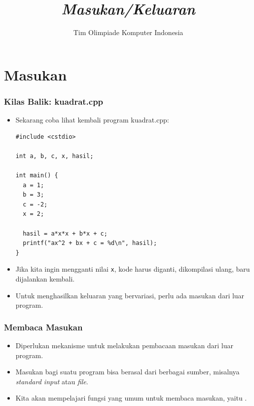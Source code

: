 

\title{\textit{Masukan/Keluaran}}
\author{Tim Olimpiade Komputer Indonesia}
\date{}



\begin{frame}
\titlepage
\end{frame}

\section{Masukan}
\frame{\sectionpage}

\begin{frame}[fragile]
\frametitle{Kilas Balik: kuadrat.cpp}
\begin{itemize}
  \item Sekarang coba lihat kembali program kuadrat.cpp:
\begin{lstlisting}
#include <cstdio>

int a, b, c, x, hasil;

int main() {
  a = 1;
  b = 3;
  c = -2;
  x = 2;

  hasil = a*x*x + b*x + c;
  printf("ax^2 + bx + c = %d\n", hasil);
}\end{lstlisting}
  \item Jika kita ingin mengganti nilai \texttt{x}, kode harus diganti, dikompilasi ulang, baru dijalankan kembali.
  \item Untuk menghasilkan keluaran yang bervariasi, perlu ada \newline masukan dari luar program.
\end{itemize}
\end{frame}

\begin{frame}
\frametitle{Membaca Masukan}
\begin{itemize}
  \item Diperlukan mekanisme untuk melakukan pembacaan masukan dari luar program.
  \item Masukan bagi suatu program bisa berasal dari berbagai sumber, misalnya \textit{standard input} atau \textit{file}.
  \item Kita akan mempelajari fungsi yang umum untuk membaca masukan, yaitu .
\end{itemize}
\end{frame}

